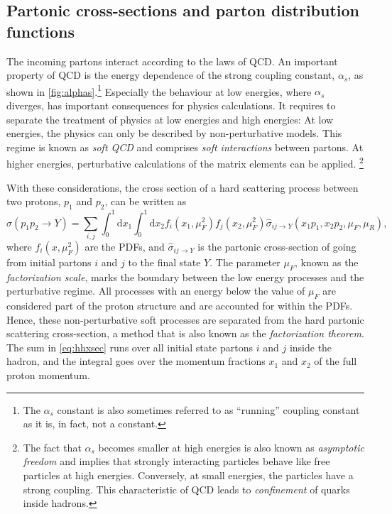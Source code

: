 \subsection{Partonic cross-sections and parton distribution functions}
The incoming partons interact according to the laws of QCD.
An important property of QCD is the energy dependence of the strong coupling constant, $\alpha_s$, as shown in \cref{fig:alphas}.\footnote{The $\alpha_s$ constant is also sometimes referred to as ``running'' coupling constant as it is, in fact, not a constant.} 
Especially the behaviour at low energies, where $\alpha_s$ diverges, has important consequences for physics calculations. It requires to separate the treatment of physics at low energies and high energies: At low energies, the physics can only be described by non-perturbative models. This regime is known as \emph{soft QCD} and comprises \emph{soft interactions} between partons.
At higher energies, perturbative calculations of the matrix elements can be applied. \footnote{The fact that $\alpha_s$ becomes smaller at high energies is also known as \emph{asymptotic freedom} and implies that strongly interacting particles behave like free particles at high energies. Conversely, at small energies, the particles have a strong coupling. This characteristic of QCD leads to \emph{confinement} of quarks inside hadrons.}

With these considerations, the cross section of a hard scattering process between two protons, $p_1$ and $p_2$, can be written as
\begin{equation}
  \sigma(p_1p_2 \to Y) = \sum_{i,j} \int_0^1 \mathrm{d}x_1 \int_0^1 \mathrm{d}x_2 f_i(x_1,\mu_F^2) f_j(x_2,\mu_F^2) \hat{\sigma}_{ij \rightarrow Y}(x_1p_1,x_2p_2,\mu_F,\mu_R), 
  \label{eq:hhxsec}
\end{equation}
where $f_i(x,\mu_F^2)$ are the PDFs, and $\hat{\sigma}_{ij \rightarrow Y}$ is the partonic cross-section of going from initial partons $i$ and $j$ to the final state $Y$.
The parameter $\mu_F$, known as the \emph{factorization scale}, marks the boundary between the low energy processes and the perturbative regime. 
All processes with an energy below the value of $\mu_F$ are considered part of the proton structure and are accounted for within the PDFs. Hence, these non-perturbative soft processes are separated from the hard partonic scattering cross-section, a method that is also known as the \emph{factorization theorem}.
The sum in \cref{eq:hhxsec} runs over all initial state partons $i$ and $j$ inside the hadron, and the integral goes over the momentum fractions $x_1$ and $x_2$ of the full proton momentum.

